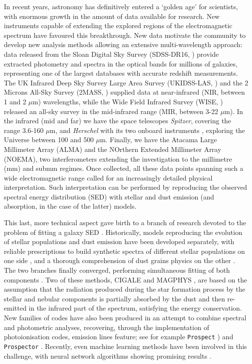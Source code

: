\documentclass{aa}
\begin{document}
In recent years, astronomy has definitively entered a `golden age' for scientists, with enormous growth in the amount  of data available for research. New instruments capable of extending the explored regions of the electromagnetic spectrum have favoured this breakthrough. New data motivate the community to develop new analysis methods allowing an extensive multi-wavelength approach: data released from the Sloan Digital Sky Survey (SDSS-DR16, \citealt{ahu}) provide extracted photometry and spectra in the optical bands for millions of galaxies, representing one of the largest databases with accurate redshift measurements. The UK Infrared Deep Sky Survey Large Area Survey (UKIDSS-LAS, \citealt{law}) and the 2 Microns All-Sky Survey (2MASS, \citealt{skr}) supplied data at near-infrared (NIR, between 1 and 2 $\mu$m)  wavelengths, while the Wide Field Infrared Survey (WISE, \citealt{wri}) released an all-sky survey in the mid-infrared range (MIR, between 3-22 $\mu$m). In the infrared (mid and far) we have the space telescopes {\it Spitzer}, covering the range 3.6-160 $\mu$m, and {\it Herschel} \citep{pil} with its two onboard instruments \citep[PACS and SPIRE, ][]{pog,gri}, exploring the Universe between 100 and 500 $\mu$m. Finally, we have the Atacama Large Millimeter Array (ALMA) and the NOrthern Extended Millimeter Array (NOEMA), two interferometers extending the investigation to the millimetre (mm) and submm regimes. Once collected, all these data points spanning such a wide electromagnetic range called for an increasingly detailed physical interpretation. Such interpretation can be performed by reproducing the observed spectral energy distribution (SED) with stellar and dust emission (and absorption, in the case of the latter) models. 

This last,  more technical aspect gave birth to a branch of research devoted to the problem of fitting a galaxy SED \citep{arn,bol,cid,ilb3,ocv,toj,fri2,fri3,fra,pap4,han,lej,wea}. Historically,  models reproducing the evolution of stellar populations and dust emission have been developed separately, with reliable prescriptions to build synthetic spectra of different stellar populations  on one side \citep{bru3, bre, wor,fio, lei, vaz, cha, mar,fio2}, and a thorough comprehension of dust grains physics on the other \citep{dra2, dal,tak2,tak1,zub,dra,dac2,sil,asa,calu,zhu,man,sch,pop,aoy,dev2,dev3,gin,gra,bur2,nan,del2,gal2}. The two branches finally converged, performing simultaneous fitting of both components \citep{dev, gro,dac,nol,sil2,gra}. Two of these methods, CIGALE \citep{nol,boq} and MAGPHYS \citep{dac}, are based on the assumption that the radiation produced during the star formation process by the stellar and nebular components is partially absorbed by the dust and then re-emitted in the infrared part of the spectrum, satisfying the energy conservation. New families of codes have also been produced in an attempt to combine spectral and photometric analyses, recovering, through the implementation of photoionisation codes, emission lines feature; see for example {\tt Prospect} \citep{rob}) and {\tt Prospector} \citep{lej}. Recently, even machine learning methods have been involved in this challenge, with neural network algorithms showing promising results \citep{sim}.
\end{document}
